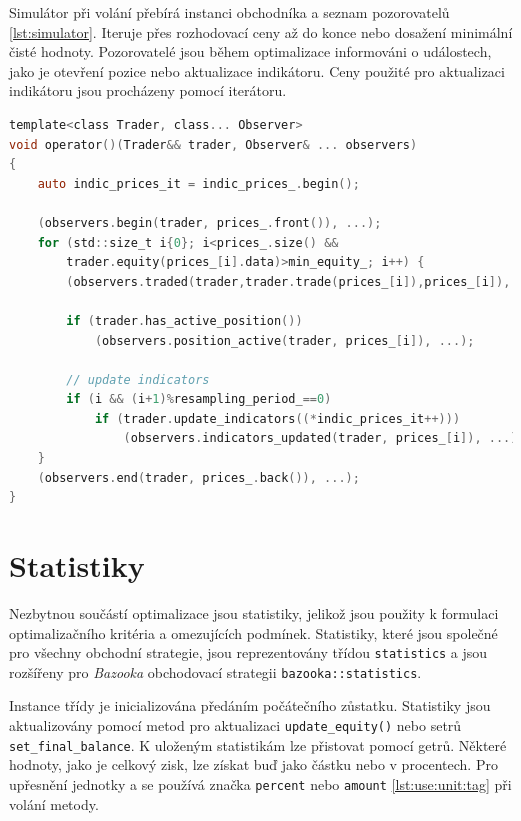 Simulátor při volání přebírá instanci obchodníka a seznam pozorovatelů \ref{lst:simulator}.
Iteruje přes rozhodovací ceny až do konce nebo dosažení minimální čisté hodnoty.
Pozorovatelé jsou během optimalizace informováni o událostech, jako je otevření pozice nebo aktualizace indikátoru.
Ceny použité pro aktualizaci indikátoru jsou procházeny pomocí iterátoru.

\begin{lstlisting}[caption={~Implementace simulace obchodování},label={lst:simulator},captionpos=t,abovecaptionskip=-\medskipamount,belowcaptionskip=\medskipamount,language=C]
template<class Trader, class... Observer>
void operator()(Trader&& trader, Observer& ... observers)
{
    auto indic_prices_it = indic_prices_.begin();

    (observers.begin(trader, prices_.front()), ...);
    for (std::size_t i{0}; i<prices_.size() &&
        trader.equity(prices_[i].data)>min_equity_; i++) {
        (observers.traded(trader,trader.trade(prices_[i]),prices_[i]),...);

        if (trader.has_active_position())
            (observers.position_active(trader, prices_[i]), ...);

        // update indicators
        if (i && (i+1)%resampling_period_==0)
            if (trader.update_indicators((*indic_prices_it++)))
                (observers.indicators_updated(trader, prices_[i]), ...);
    }
    (observers.end(trader, prices_.back()), ...);
}
\end{lstlisting}

\section{Statistiky}
Nezbytnou součástí optimalizace jsou statistiky, jelikož jsou použity k formulaci optimalizačního kritéria a omezujících podmínek.
Statistiky, které jsou společné pro všechny obchodní strategie, jsou reprezentovány třídou \texttt{statistics} a jsou rozšířeny pro \textit{Bazooka} obchodovací strategii \texttt{bazooka::statistics}.

Instance třídy je inicializována předáním počátečního zůstatku.
Statistiky jsou aktualizovány pomocí metod pro aktualizaci \texttt{update\_equity()} nebo setrů \texttt{set\_final\_balance}.
K uloženým statistikám lze přistovat pomocí getrů.
Některé hodnoty, jako je celkový zisk, lze získat buď jako částku nebo v procentech.
Pro upřesnění jednotky a se používá značka \texttt{percent} nebo \texttt{amount} \ref{lst:use:unit:tag} při volání metody.

